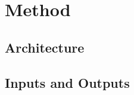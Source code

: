 %

\section{Method}
\label{sec:method}


\subsection{Architecture}
\label{subsec:method_arch}


\subsection{Inputs and Outputs}
\label{subsec:method_io}


